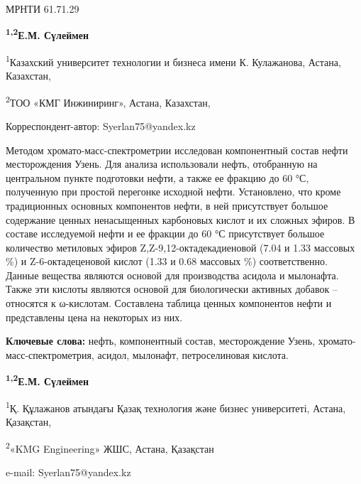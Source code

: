 \newpage
МРНТИ 61.71.29


\begin{center}
{\bfseries \textsuperscript{1,2}Е.М. Сүлеймен}

\textsuperscript{1}Казахский университет технологии и бизнеса имени К.
Кулажанова, Астана, Казахстан,

\textsuperscript{2}ТОО «КМГ Инжиниринг», Астана, Казахстан,
\end{center}
\envelope Корреспондент-автор: Syerlan75@yandex.kz

Методом хромато-масс-спектрометрии исследован компонентный состав нефти
месторождения Узень. Для анализа использовали нефть, отобранную на
центральном пункте подготовки нефти, а также ее фракцию до 60 °С,
полученную при простой перегонке исходной нефти. Установлено, что кроме
традиционных основных компонентов нефти, в ней присутствует большое
содержание ценных ненасыщенных карбоновых кислот и их сложных эфиров. В
составе исследуемой нефти и ее фракции до 60 °С присутствует большое
количество метиловых эфиров Z,Z-9,12-октадекадиеновой (7.04 и 1.33
массовых \%) и Z-6-октадеценовой кислот (1.33 и 0.68 массовых \%)
соответственно. Данные вещества являются основой для производства
асидола и мылонафта. Также эти кислоты являются основой для биологически
активных добавок -- относятся к ω-кислотам. Составлена таблица ценных
компонентов нефти и представлены цена на некоторых из них.

{\bfseries Ключевые слова:} нефть, компонентный состав, месторождение
Узень, хромато-масс-спектрометрия, асидол, мылонафт, петроселиновая
кислота.


\begin{center}
{\bfseries \textsuperscript{1,2}Е.М. Сүлеймен}

\textsuperscript{1}Қ. Құлажанов атындағы Қазақ технология және бизнес
университеті, Астана, Қазақстан,

\textsuperscript{2}«KMG Engineering» ЖШС, Астана, Қазақстан

e-mail: Syerlan75@yandex.kz
\end{center}

